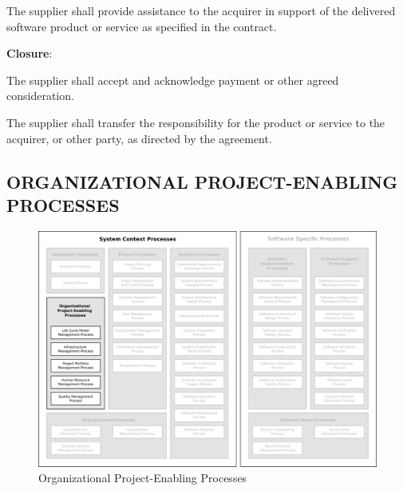 \begin{adjustwidth}{2em}{0pt}
\begin{compactenum}
\begin{compactenum}
						\item The supplier shall provide assistance to the acquirer in support of the delivered software product or service as specified in the contract.

					\end{compactenum}

					\item {\bf Closure}:

					\begin{compactenum}

						\item The supplier shall accept and acknowledge payment or other agreed consideration.

						\item The supplier shall transfer the responsibility for the product or service to the acquirer, or other party, as directed by the agreement.

					\end{compactenum}

				\end{compactenum}

			\end{adjustwidth}


	\newpage 
	\subsection{ORGANIZATIONAL PROJECT-ENABLING PROCESSES\label{subsec:organizational_project_enabling_processes}}

		\begin{figure}[h]
			\centering
			\includegraphics[width=15cm,keepaspectratio]{figures/life-cycle-process-groups-organizational-project-enabling-processes.pdf}
			\caption{Organizational Project-Enabling Processes}
			\label{fig:organizational_project_enabling_processes}
		\end{figure}

